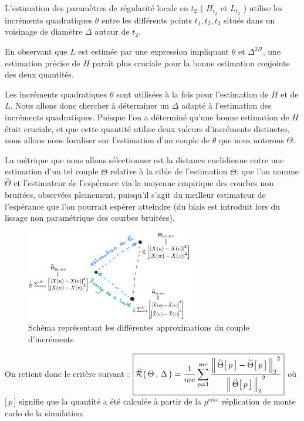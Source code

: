 L'estimation des paramètres de régularité locale en $t_2$ ( $H_{t_2}$ et $L_{t_2}$ ) utilise les incréments quadratiques $\theta$ entre les différents points $t_1, t_2, t_3$ situés dans un voisinage de diamètre $\Delta$ autour de $t_2$.

En observant que $L$ est estimée par une expression impliquant $\theta$ et $\Delta^{2 H}$, une estimation précise de $H$ paraît plus cruciale pour la bonne estimation conjointe des deux quantités.


Les incréments quadratiques $\theta$ sont utilisées à la fois pour l'estimation de $H$ et de $L$. Nous allons donc chercher à déterminer un $\Delta$ adapté à l'estimation des incréments quadratiques. Puisque l'on a déterminé qu'une bonne estimation de $H$ était cruciale, et que cette quantité utilise deux valeurs d'incréments distinctes, nous allons nous focaliser sur l'estimation d'un couple de $\theta$ que nous noterons $\Theta$.

\bigskip

La métrique que nous allons sélectionner est la distance euclidienne entre une estimation d'un tel couple $\Theta$ relative à la cible de l'estimation $\widetilde \Theta$, que l'on nomme $\widehat \Theta$ et l'estimateur de l'espérance via la moyenne empirique des courbes non bruitées, observées pleinement, puisqu'il s'agit du meilleur estimateur de l'espérance que l'on pourrait espérer atteindre (du biais est introduit lors du lissage non paramétrique des courbes bruitées).

\begin{figure}[H]
	\centering
	\includegraphics[width=0.65\textwidth]{Images/sketches/theta_biais.png}
	\caption{Schéma représentant les différentes approximations du couple d'incréments}
	\label{fig:sketch_theta_biais_corpus}
\end{figure}

On retient donc le critère suivant : $\boxed{\widehat{\mathcal R} \bigl( \, \Theta \, , \, \Delta \, \bigr) = \frac 1 {mc} \sum\limits_{p=1}^{mc} \frac{{\distnorme 2 {\widehat \Theta\bigl[\, p \,\bigr]} {\widetilde \Theta \bigl[ \,p \,\bigr]}}^2}{{\norme 2 {\widetilde \Theta \bigl[ \,p \,\bigr]}}^2}}$ \; où $[\, p \,\bigr]$ signifie que la quantité a été calculée à partir de la $p^{eme}$ réplication de monte carlo de la simulation.